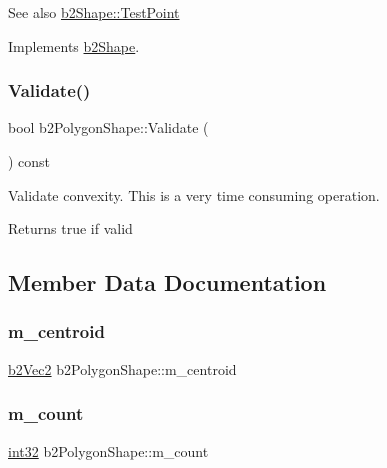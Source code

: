 \begin{DoxySeeAlso}{See also}
\mbox{\hyperlink{classb2_shape_a6ac968e403e2d93e8ae46d728a2e50fa}{b2\+Shape\+::\+Test\+Point}} 
\end{DoxySeeAlso}


Implements \mbox{\hyperlink{classb2_shape_a6ac968e403e2d93e8ae46d728a2e50fa}{b2\+Shape}}.

\mbox{\label{classb2_polygon_shape_a135f4c20e17f10479e08f7befbd4d1f0}} 
\subsubsection{\texorpdfstring{Validate()}{Validate()}}
{\footnotesize\ttfamily bool b2\+Polygon\+Shape\+::\+Validate (\begin{DoxyParamCaption}{ }\end{DoxyParamCaption}) const}

Validate convexity. This is a very time consuming operation. \begin{DoxyReturn}{Returns}
true if valid 
\end{DoxyReturn}


\subsection{Member Data Documentation}
\mbox{\label{classb2_polygon_shape_ae8f5bd2f13f1e9b741c33350ba19cd9f}} 
\subsubsection{\texorpdfstring{m\_centroid}{m\_centroid}}
{\footnotesize\ttfamily \mbox{\hyperlink{structb2_vec2}{b2\+Vec2}} b2\+Polygon\+Shape\+::m\+\_\+centroid}

\mbox{\label{classb2_polygon_shape_a2c8cfdc15267f282e66f7bda7369b79f}} 
\subsubsection{\texorpdfstring{m\_count}{m\_count}}
{\footnotesize\ttfamily \mbox{\hyperlink{b2_settings_8h_a43d43196463bde49cb067f5c20ab8481}{int32}} b2\+Polygon\+Shape\+::m\+\_\+count}

